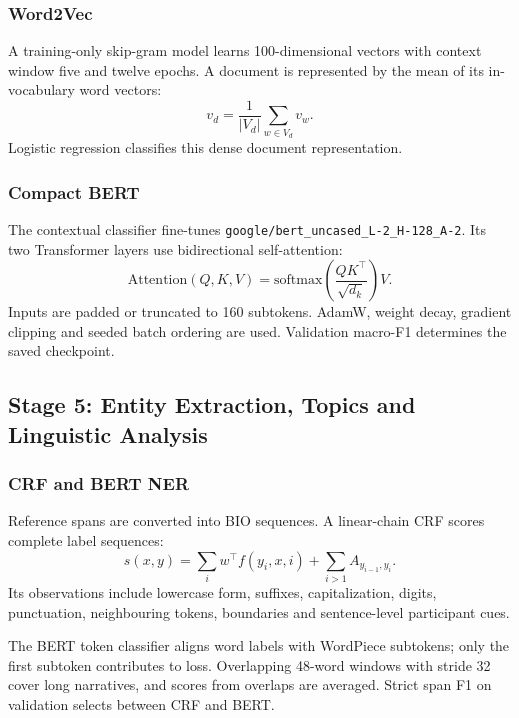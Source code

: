 \documentclass[conference]{IEEEtran}
\begin{document}
\subsubsection{Word2Vec}
A training-only skip-gram model learns 100-dimensional vectors with context window five and twelve epochs. A document is represented by the mean of its in-vocabulary word vectors:
\begin{equation}
v_d=\frac{1}{|V_d|}\sum_{w\in V_d}v_w.
\end{equation}
Logistic regression classifies this dense document representation.

\subsubsection{Compact BERT}
The contextual classifier fine-tunes \texttt{google/bert\_uncased\_L-2\_H-128\_A-2}. Its two Transformer layers use bidirectional self-attention:
\begin{equation}
\mathrm{Attention}(Q,K,V)=
\mathrm{softmax}\left(\frac{QK^\top}{\sqrt{d_k}}\right)V.
\end{equation}
Inputs are padded or truncated to 160 subtokens. AdamW, weight decay, gradient clipping and seeded batch ordering are used. Validation macro-F1 determines the saved checkpoint.

\subsection{Stage 5: Entity Extraction, Topics and Linguistic Analysis}

\subsubsection{CRF and BERT NER}
Reference spans are converted into BIO sequences. A linear-chain CRF scores complete label sequences:
\begin{equation}
s(x,y)=\sum_i w^\top f(y_i,x,i)+
\sum_{i>1}A_{y_{i-1},y_i}.
\end{equation}
Its observations include lowercase form, suffixes, capitalization, digits, punctuation, neighbouring tokens, boundaries and sentence-level participant cues.

The BERT token classifier aligns word labels with WordPiece subtokens; only the first subtoken contributes to loss. Overlapping 48-word windows with stride 32 cover long narratives, and scores from overlaps are averaged. Strict span F1 on validation selects between CRF and BERT.
\end{document}
